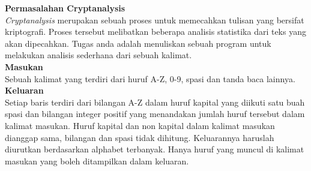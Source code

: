 \begin{pemrograman}
\label{lat:cryptanalysis}
\textbf{Permasalahan Cryptanalysis}\\
\textit{Cryptanalysis} merupakan sebuah proses untuk memecahkan tulisan yang bersifat kriptografi. Proses tersebut melibatkan beberapa analisis statistika dari teks yang akan dipecahkan. Tugas anda adalah menuliskan sebuah program untuk melakukan analisis sederhana dari sebuah kalimat.\\
\textbf{Masukan}\\
Sebuah kalimat yang terdiri dari huruf A-Z, 0-9, spasi dan tanda baca lainnya.\\
\textbf{Keluaran}\\
Setiap baris terdiri dari bilangan A-Z dalam huruf kapital yang diikuti satu buah spasi dan bilangan integer positif yang menandakan jumlah huruf tersebut dalam kalimat masukan. Huruf kapital dan non kapital dalam kalimat masukan dianggap sama, bilangan dan spasi tidak dihitung. Keluarannya haruslah diurutkan berdasarkan alphabet terbanyak. Hanya huruf yang muncul di kalimat masukan yang boleh ditampilkan dalam keluaran.\\
\end{pemrograman}
